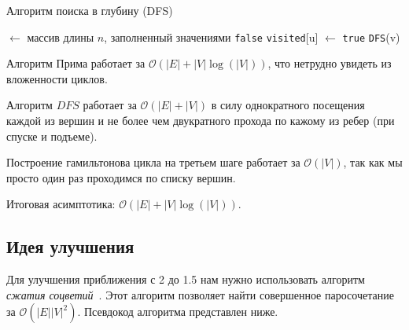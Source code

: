 \begin{algorithm}[H]
    \caption{Алгоритм поиска в глубину (DFS)}
    \begin{algorithmic}[1]
        \State {} $\gets$ массив длины $n$, заполненный значениями \texttt{false}
        \State \texttt{visited}[u] $\gets$ \texttt{true}
        \State \texttt{DFS}(v)
        \EndIf
        \EndFor
    \end{algorithmic}
\end{algorithm}

Алгоритм Прима работает за $\mathcal{O}(|E| + |V| \log(|V|))$, что нетрудно увидеть из вложенности циклов.

Алгоритм $DFS$ работает за $\mathcal{O}(|E| + |V|)$ в силу однократного посещения каждой из вершин и не более чем двукратного
прохода по кажому из ребер (при спуске и подъеме).

Построение гамильтонова цикла на третьем шаге работает за $\mathcal{O}(|V|)$, так как мы просто один раз проходимся по списку вершин.

Итоговая асимптотика: $\mathcal{O}(|E| + |V| \log(|V|))$.

\subsection{Идея улучшения}
Для улучшения приближения с 2 до 1.5 нам нужно использовать алгоритм \textit{сжатия соцветий}~\cite{shoemaker2016blossom}.
Этот алгоритм позволяет найти совершенное паросочетание за $\mathcal{O}(|E||V|^2)$. Псевдокод алгоритма представлен ниже.

